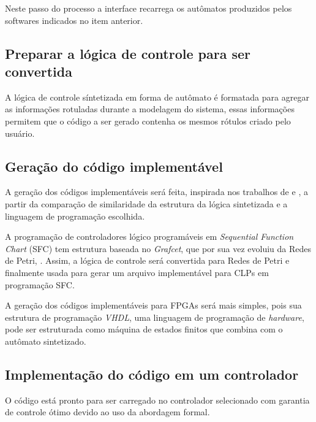 Neste passo do processo a interface recarrega os aut\^omatos produzidos pelos softwares indicados no item anterior.

\subsection{Preparar a l\'ogica de controle para ser convertida}

A l\'ogica de controle s\'intetizada em forma de aut\^omato \'e formatada para agregar as informa\c{c}\~oes rotuladas durante a modelagem do sistema, essas informa\c{c}\~oes permitem que o c\'odigo a ser gerado contenha os mesmos r\'otulos criado pelo usu\'ario. 

\subsection{Gera\c{c}\~ao do c\'odigo implement\'avel}

A gera\c{c}\~ao dos c\'odigos implement\'aveis ser\'a feita, inspirada nos trabalhos de \cite{hugomestrado} e \cite{disc}, a partir da compara\c{c}\~ao de similaridade da estrutura da l\'ogica sintetizada e a linguagem de programa\c{c}\~ao escolhida.

A programa\c{c}\~ao de controladores l\'ogico program\'aveis em \textit{Sequential Function Chart} (SFC) tem estrutura baseada no \textit{Grafcet}, que por sua vez evoluiu da Redes de Petri, \cite{Martin1999}. Assim, a l\'ogica de controle ser\'a convertida para Redes de Petri e finalmente usada para gerar um arquivo implement\'avel para CLPs em programa\c{c}\~ao SFC.

A gera\c{c}\~ao dos c\'odigos implement\'aveis para FPGAs ser\'a mais simples, pois sua estrutura de programa\c{c}\~ao \textit{VHDL}, uma linguagem de programa\c{c}\~ao de \textit{hardware}, pode ser estruturada como m\'aquina de estados finitos que combina com o aut\^omato sintetizado.

\subsection{Implementa\c{c}\~ao do c\'odigo em um controlador}

O c\'odigo est\'a pronto para ser carregado no controlador selecionado com garantia de controle \'otimo devido ao uso da abordagem formal.




%

